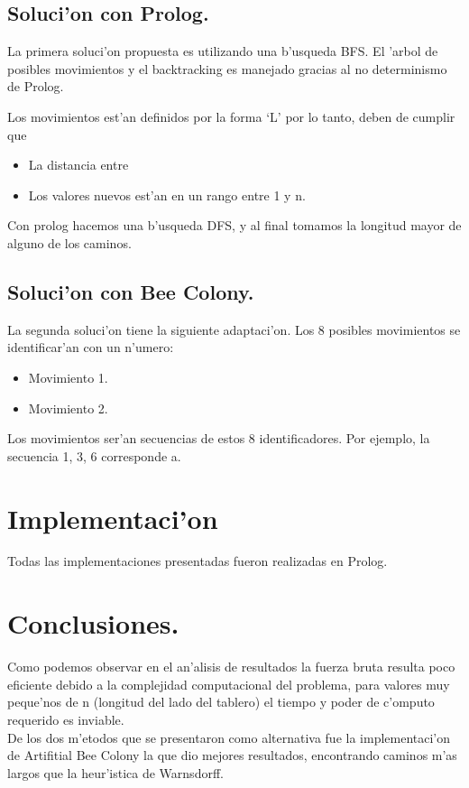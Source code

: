 \documentclass[12pt]{article}
\begin{document}
    \subsection{Soluci'on con Prolog.}
    La primera soluci'on propuesta es utilizando una b'usqueda BFS.
    El 'arbol de posibles movimientos y el backtracking es manejado
    gracias al no determinismo de Prolog.

    Los movimientos est'an definidos por la forma `L' \; por lo tanto, deben de cumplir
    que
    \begin{itemize}
        \item La distancia entre
        \item Los valores nuevos est'an en un rango entre 1 y n.
    \end{itemize}

    Con prolog hacemos una b'usqueda DFS, y al final tomamos
    la longitud mayor de alguno de los caminos.

    \subsection{Soluci'on con Bee Colony.}

    La segunda soluci'on tiene la siguiente adaptaci'on.
    Los 8 posibles movimientos se identificar'an con un n'umero:
    \begin{itemize}
        \item Movimiento 1.
        \item Movimiento 2.
    \end{itemize}

    Los movimientos ser'an secuencias de estos 8 identificadores.
    Por ejemplo, la secuencia 1, 3, 6 corresponde a.
    \section{Implementaci'on}

    Todas las implementaciones presentadas fueron realizadas en Prolog.

    \section{Conclusiones.}
    Como podemos observar en el an'alisis de resultados la fuerza bruta
    resulta poco eficiente debido a la complejidad computacional del problema,
    para valores muy peque'nos de n (longitud del lado del tablero)
    el tiempo y poder de c'omputo requerido es inviable. \\
    De los  dos m'etodos que se presentaron como alternativa
    fue la implementaci'on de Artifitial Bee Colony la que dio mejores resultados,
    encontrando caminos m'as largos que la heur'istica de Warnsdorff. \\
\end{document}
